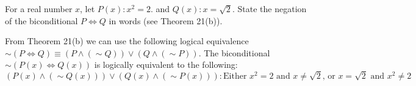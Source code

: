 \documentclass[12pt]{article}
\newenvironment{problem}[2][Problem]{\begin{trivlist}
		\item[\hskip \labelsep {\bfseries #1}\hskip \labelsep {\bfseries #2.}]}{\end{trivlist}}
\newenvironment{solution}[2][Solution]{\begin{trivlist}
		\item[\hskip \labelsep {\bfseries #1}\hskip \labelsep {\bfseries #2.}]}{\end{trivlist}}
\begin{document}
\begin{problem}{61}
	For a real number $x$, let $P(x):x^{2} = 2.$ and $Q(x):x=\sqrt{2}$. State the negation of the biconditional $P \Leftrightarrow Q$ in words (see Theorem 21(b)).
	\begin{solution}{}
		From Theorem 21(b) we can use the following logical equivalence $\sim(P\Leftrightarrow Q) \equiv (P\wedge (\sim Q))\vee (Q\wedge (\sim P))$. The biconditional $\sim(P(x)\Leftrightarrow Q(x))$ is logically equivalent to the following:
		\begin{equation*}
			(P(x)\wedge (\sim Q(x)))\vee (Q(x) \wedge (\sim P(x))):\text{Either } x^{2} = 2 \text{ and } x\neq \sqrt{2} \text{, or } x = \sqrt{2} \text{ and } x^{2} \neq 2
		\end{equation*}
	\end{solution}
\end{problem}
\end{document}
